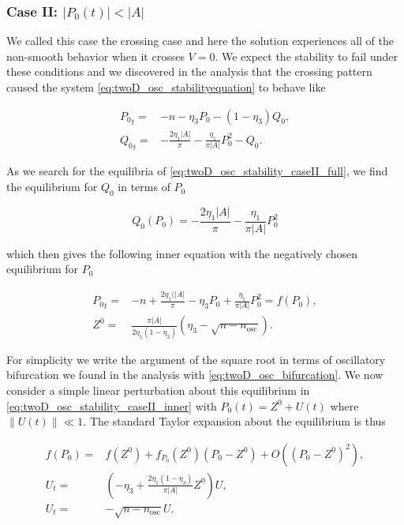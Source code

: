 \subsubsection{Case II: $|P_0(t)|<|A|$}

We called this case the crossing case and here the solution experiences all of the non-smooth behavior when it crosses $V=0$. We expect the stability to fail under these conditions and we discovered in the analysis that the crossing pattern caused the system \eqref{eq:twoD_osc_stabilityequation} to behave like

\begin{equation}\label{eq:twoD_osc_stability_caseII_full}
\begin{aligned}
{P_0}_t =& -n-\eta_3 P_0-(1-\eta_3)Q_0,\\
{Q_0}_t =& -\frac{2\eta_1|A|}{\pi}-\frac{\eta_1}{\pi |A|}P_0^2-Q_0.
\end{aligned}
\end{equation}

As we search for the equilibria of \eqref{eq:twoD_osc_stability_caseII_full}, we find the equilibrium for $Q_0$ in terms of $P_0$  

\begin{equation*}
Q_0(P_0)=-\frac{2\eta_1|A|}{\pi}-\frac{\eta_1}{\pi |A|}P_0^2
\end{equation*}

which then gives the following inner equation with the negatively chosen equilibrium for $P_0$

\begin{equation}\label{eq:twoD_osc_stability_caseII_inner}
\begin{aligned}
{P_0}_t=&-n+\frac{2\eta_1(|A|}{\pi}-\eta_3 P_0+\frac{\eta_1}{\pi |A|}P_0^2=f(P_0),\\
Z^0=&\frac{\pi |A|}{2\eta_1(1-\eta_3)}\left(\eta_3-\sqrt{n-n_{\text{osc}}}\right).
\end{aligned}
\end{equation}

For simplicity we write the argument of the square root in terms of oscillatory bifurcation we found in the analysis with \eqref{eq:twoD_osc_bifurcation}. We now consider a simple linear perturbation about this equilibrium in \eqref{eq:twoD_osc_stability_caseII_inner} with $P_0(t)=Z^0+U(t)$ where $\lVert U(t)\rVert\ll 1$. The standard Taylor expansion about the equilibrium is thus

\begin{equation}\label{eqLtwoD_osc_stability_caseII_perturb}
\begin{aligned}
f(P_0)=&f(Z^0)+f_{P_0}(Z^0)(P_0-Z^0)+O((P_0-Z^0)^2),\\
U_t=&\left(-\eta_3+\frac{2\eta_1(1-\eta_3)}{\pi |A|}Z^0\right)U,\\
U_t=&- \sqrt{n-n_{\text{osc}}}U.
\end{aligned}
\end{equation}

